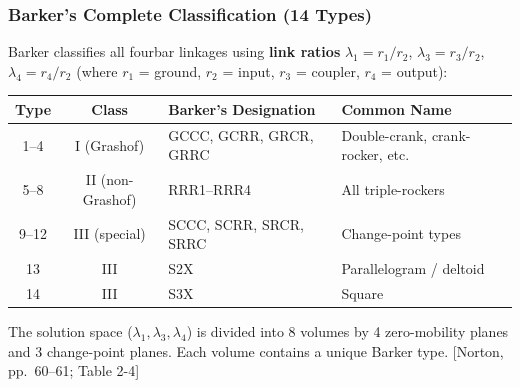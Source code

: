 \documentclass[10pt,aspectratio=43]{beamer}
\newcommand{\pref}[1]{\vfill\hfill{\scriptsize\color{gray}[Norton, pp.~#1]}}
\begin{document}
\begin{frame}
\frametitle{Barker's Complete Classification (14 Types)}

Barker classifies all fourbar linkages using \textbf{link ratios} $\lambda_1 = r_1/r_2$, $\lambda_3 = r_3/r_2$, $\lambda_4 = r_4/r_2$ (where $r_1$ = ground, $r_2$ = input, $r_3$ = coupler, $r_4$ = output):

\vspace{4pt}
\begin{center}
\scriptsize
\begin{tabular}{c|c|l|l}
\toprule
\textbf{Type} & \textbf{Class} & \textbf{Barker's Designation} & \textbf{Common Name} \\
\midrule
1--4 & I (Grashof) & GCCC, GCRR, GRCR, GRRC & Double-crank, crank-rocker, etc. \\
5--8 & II (non-Grashof) & RRR1--RRR4 & All triple-rockers \\
9--12 & III (special) & SCCC, SCRR, SRCR, SRRC & Change-point types \\
13 & III & S2X & Parallelogram / deltoid \\
14 & III & S3X & Square \\
\bottomrule
\end{tabular}
\end{center}

\vspace{4pt}
The solution space ($\lambda_1, \lambda_3, \lambda_4$) is divided into 8 volumes by 4 zero-mobility planes and 3 change-point planes. Each volume contains a unique Barker type.
\pref{60--61; Table 2-4}
\end{frame}

\end{document}
